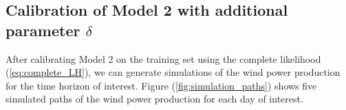 \documentclass[11pt]{article}
\theoremstyle{definition}
\begin{document}

\subsection{Calibration of Model 2 with additional parameter $\delta$}

After calibrating Model 2 on the training set using the complete likelihood (\ref{eq:complete_LH}), we can generate simulations of the wind power production for the time horizon of interest. Figure (\ref{fig:simulation_paths}) shows five simulated paths of the wind power production for each day of interest.
\end{document}
